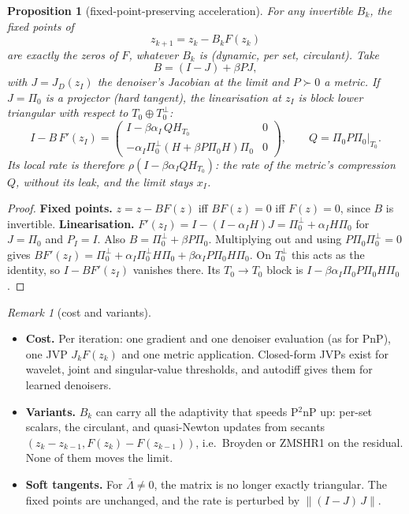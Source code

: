 \documentclass[11pt]{article}
\newtheorem{proposition}[theorem]{Proposition}
\theoremstyle{definition}
\theoremstyle{remark}
\newtheorem{remark}[theorem]{Remark}
\newcommand{\norm}[1]{\lVert #1\rVert}
\begin{document}
\begin{proposition}[fixed-point-preserving acceleration]\label{prop:keepfp}
For any invertible $B_k$, the fixed points of
\[
z_{k+1}=z_k-B_kF(z_k)
\]
are exactly the zeros of $F$, whatever $B_k$ is (dynamic, per set, circulant). Take
\[
B=(I-J)+\beta PJ,
\]
with $J=J_D(z_I)$ the denoiser's Jacobian at the limit and $P\succ0$ a metric. If $J=\Pi_0$ is a projector
(hard tangent), the linearisation at $z_I$ is block lower triangular with respect to $T_0\oplus T_0^\perp$:
\[
I-B\,F'(z_I)=\begin{pmatrix}I-\beta\alpha_I\,QH_{T_0}&0\\ -\alpha_I\Pi_0^\perp(H+\beta P\Pi_0H)\Pi_0&0\end{pmatrix},\qquad Q=\Pi_0P\Pi_0|_{T_0}.
\]
Its local rate is therefore $\rho(I-\beta\alpha_IQH_{T_0})$: the rate of the metric's compression $Q$, without
its leak, and the limit stays $x_I$.
\end{proposition}
\begin{proof}
\textbf{Fixed points.} $z=z-BF(z)$ iff $BF(z)=0$ iff $F(z)=0$, since $B$ is invertible.
\textbf{Linearisation.} $F'(z_I)=I-(I-\alpha_IH)J=\Pi_0^\perp+\alpha_IH\Pi_0$ for $J=\Pi_0$ and $P_I=I$. Also
$B=\Pi_0^\perp+\beta P\Pi_0$. Multiplying out and using $P\Pi_0\Pi_0^\perp=0$ gives
$BF'(z_I)=\Pi_0^\perp+\alpha_I\Pi_0^\perp H\Pi_0+\beta\alpha_IP\Pi_0H\Pi_0$. On $T_0^\perp$ this acts as the
identity, so $I-BF'(z_I)$ vanishes there. Its $T_0\to T_0$ block is $I-\beta\alpha_I\Pi_0P\Pi_0H\Pi_0$.
\end{proof}

\begin{remark}[cost and variants]\label{rem:keepfp}
\begin{itemize}
\item \textbf{Cost.} Per iteration: one gradient and one denoiser evaluation (as for PnP), one JVP $J_kF(z_k)$ and
  one metric application. Closed-form JVPs exist for wavelet, joint and singular-value thresholds, and autodiff
  gives them for learned denoisers.
\item \textbf{Variants.} $B_k$ can carry all the adaptivity that speeds P$^2$nP up: per-set scalars, the circulant,
  and quasi-Newton updates from secants $(z_k-z_{k-1},F(z_k)-F(z_{k-1}))$, i.e.\ Broyden or ZMSHR1 on the residual.
  None of them moves the limit.
\item \textbf{Soft tangents.} For $\bar\Lambda\neq0$, the matrix is no longer exactly triangular. The fixed points
  are unchanged, and the rate is perturbed by $\norm{(I-J)\,J}$.
\end{itemize}
\end{remark}
\end{document}
